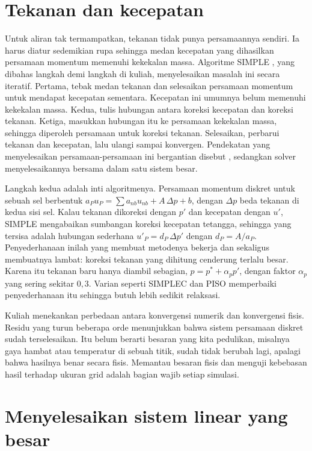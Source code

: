 \section{Tekanan dan kecepatan}

Untuk aliran tak termampatkan, tekanan tidak punya persamaannya sendiri. Ia harus diatur sedemikian
rupa sehingga medan kecepatan yang dihasilkan persamaan momentum memenuhi kekekalan massa.
Algoritme SIMPLE \citep{patankar1972,patankar1980}, yang dibahas langkah demi langkah di kuliah,
menyelesaikan masalah ini secara iteratif. Pertama, tebak medan tekanan dan selesaikan persamaan
momentum untuk mendapat kecepatan sementara. Kecepatan ini umumnya belum memenuhi kekekalan massa.
Kedua, tulis hubungan antara koreksi kecepatan dan koreksi tekanan. Ketiga, masukkan hubungan itu
ke persamaan kekekalan massa, sehingga diperoleh persamaan untuk koreksi tekanan. Selesaikan,
perbarui tekanan dan kecepatan, lalu ulangi sampai konvergen. Pendekatan yang menyelesaikan
persamaan-persamaan ini bergantian disebut , sedangkan solver
 menyelesaikannya bersama dalam satu sistem besar.

Langkah kedua adalah inti algoritmenya. Persamaan momentum diskret untuk sebuah sel berbentuk
$a_Pu_P=\sum a_{nb}u_{nb}+A\,\Delta p+b$, dengan $\Delta p$ beda tekanan di kedua sisi sel. Kalau tekanan dikoreksi
dengan $p'$ dan kecepatan dengan $u'$, SIMPLE mengabaikan sumbangan koreksi kecepatan tetangga, sehingga yang
tersisa adalah hubungan sederhana $u'_P=d_P\,\Delta p'$ dengan $d_P=A/a_P$. Penyederhanaan inilah yang membuat
metodenya bekerja dan sekaligus membuatnya lambat: koreksi tekanan yang dihitung cenderung terlalu besar.
Karena itu tekanan baru hanya diambil sebagian, $p=p^*+\alpha_pp'$, dengan faktor 
$\alpha_p$ yang sering sekitar $0{,}3$. Varian seperti SIMPLEC dan PISO memperbaiki penyederhanaan itu sehingga
butuh lebih sedikit relaksasi.

Kuliah menekankan perbedaan antara konvergensi numerik dan konvergensi fisis. Residu yang turun
beberapa orde menunjukkan bahwa sistem persamaan diskret sudah terselesaikan. Itu belum berarti
besaran yang kita pedulikan, misalnya gaya hambat atau temperatur di sebuah titik, sudah tidak
berubah lagi, apalagi bahwa hasilnya benar secara fisis. Memantau besaran fisis dan menguji
kebebasan hasil terhadap ukuran grid adalah bagian wajib setiap simulasi.

\section{Menyelesaikan sistem linear yang besar}

